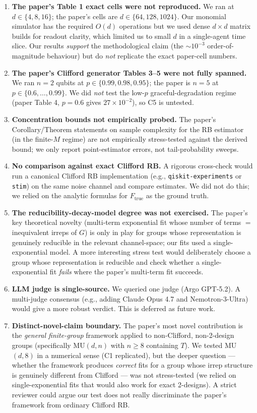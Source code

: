 \documentclass[11pt]{article}
\begin{document}
\begin{enumerate}
    \item \textbf{The paper's Table 1 exact cells were not reproduced.} We ran at $d\in\{4,8,16\}$; the paper's cells are $d\in\{64,128,1024\}$. Our monomial simulator has the required $O(d)$ operations but we used dense $d\times d$ matrix builds for readout clarity, which limited us to small $d$ in a single-agent time slice. Our results \emph{support} the methodological claim (the $\sim\!10^{-3}$ order-of-magnitude behaviour) but do \emph{not} replicate the exact paper-cell numbers.
    \item \textbf{The paper's Clifford generator Tables 3--5 were not fully spanned.} We ran $n=2$ qubits at $p\in\{0.99, 0.98, 0.95\}$; the paper is $n=5$ at $p\in\{0.6,\dots,0.99\}$. We did \emph{not} test the low-$p$ graceful-degradation regime (paper Table 4, $p=0.6$ gives $27\times 10^{-2}$), so C5 is untested.
    \item \textbf{Concentration bounds not empirically probed.} The paper's Corollary/Theorem statements on sample complexity for the RB estimator (in the finite-$M$ regime) are not empirically stress-tested against the derived bound; we only report point-estimator errors, not tail-probability sweeps.
    \item \textbf{No comparison against exact Clifford RB.} A rigorous cross-check would run a canonical Clifford RB implementation (e.g., \texttt{qiskit-experiments} or \texttt{stim}) on the same noise channel and compare estimates. We did not do this; we relied on the analytic formulas for $F_{\text{true}}$ as the ground truth.
    \item \textbf{The reducibility-decay-model degree was not exercised.} The paper's key theoretical novelty (multi-term exponential fit whose number of terms $=$ inequivalent irreps of $G$) is only in play for groups whose representation is genuinely reducible in the relevant channel-space; our fits used a single-exponential model. A more interesting stress test would deliberately choose a group whose representation is reducible and check whether a single-exponential fit \emph{fails} where the paper's multi-term fit succeeds.
    \item \textbf{LLM judge is single-source.} We queried one judge (Argo GPT-5.2). A multi-judge consensus (e.g., adding Claude Opus 4.7 and Nemotron-3-Ultra) would give a more robust verdict. This is deferred as future work.
    \item \textbf{Distinct-novel-claim boundary.} The paper's most novel contribution is the \emph{general finite-group} framework applied to non-Clifford, non-2-design groups (specifically MU$(d,n)$ with $n\ge 8$ containing $T$). We tested MU$(d,8)$ in a numerical sense (C1 replicated), but the deeper question --- whether the framework produces \emph{correct} fits for a group whose irrep structure is genuinely different from Clifford --- was not stress-tested (we relied on single-exponential fits that would also work for exact 2-designs). A strict reviewer could argue our test does not really discriminate the paper's framework from ordinary Clifford RB.
\end{enumerate}
\end{document}
